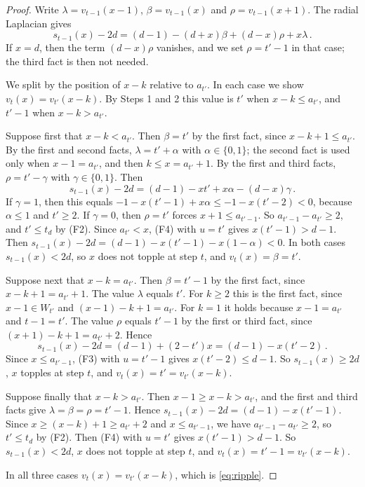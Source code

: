 \documentclass[12pt]{amsart}
\begin{document}
\begin{proof}
        Write $\lambda=v_{t-1}(x-1)$, $\beta=v_{t-1}(x)$ and $\rho=v_{t-1}(x+1)$. The radial Laplacian gives
        \begin{equation*}
        s_{t-1}(x)-2d=(d-1)-(d+x)\beta+(d-x)\rho+x\lambda\,.
        \end{equation*}
        If $x=d$, then the term $(d-x)\rho$ vanishes, and we set $\rho=t'-1$ in that case; the third fact is then not needed.

        We split by the position of $x-k$ relative to $a_{t'}$. In each case we show $v_t(x)=v_{t'}(x-k)$. By Steps 1 and 2 this value is $t'$ when $x-k\leq a_{t'}$, and $t'-1$ when $x-k>a_{t'}$.

        Suppose first that $x-k<a_{t'}$. Then $\beta=t'$ by the first fact, since $x-k+1\leq a_{t'}$. By the first and second facts, $\lambda=t'+\alpha$ with $\alpha\in\{0,1\}$; the second fact is used only when $x-1=a_{t'}$, and then $k\leq x=a_{t'}+1$. By the first and third facts, $\rho=t'-\gamma$ with $\gamma\in\{0,1\}$. Then
        \begin{equation*}
        s_{t-1}(x)-2d=(d-1)-xt'+x\alpha-(d-x)\gamma\,.
        \end{equation*}
        If $\gamma=1$, then this equals $-1-x(t'-1)+x\alpha\leq -1-x(t'-2)<0$, because $\alpha\leq 1$ and $t'\geq 2$. If $\gamma=0$, then $\rho=t'$ forces $x+1\leq a_{t'-1}$. So $a_{t'-1}-a_{t'}\geq 2$, and $t'\leq t_d$ by (F2). Since $a_{t'}<x$, (F4) with $u=t'$ gives $x(t'-1)>d-1$. Then $s_{t-1}(x)-2d=(d-1)-x(t'-1)-x(1-\alpha)<0$. In both cases $s_{t-1}(x)<2d$, so $x$ does not topple at step $t$, and $v_t(x)=\beta=t'$.

        Suppose next that $x-k=a_{t'}$. Then $\beta=t'-1$ by the first fact, since $x-k+1=a_{t'}+1$. The value $\lambda$ equals $t'$. For $k\geq 2$ this is the first fact, since $x-1\in W_{t'}$ and $(x-1)-k+1=a_{t'}$. For $k=1$ it holds because $x-1=a_{t'}$ and $t-1=t'$. The value $\rho$ equals $t'-1$ by the first or third fact, since $(x+1)-k+1=a_{t'}+2$. Hence
        \begin{equation*}
        s_{t-1}(x)-2d=(d-1)+(2-t')x=(d-1)-x(t'-2)\,.
        \end{equation*}
        Since $x\leq a_{t'-1}$, (F3) with $u=t'-1$ gives $x(t'-2)\leq d-1$. So $s_{t-1}(x)\geq 2d$, $x$ topples at step $t$, and $v_t(x)=t'=v_{t'}(x-k)$.

        Suppose finally that $x-k>a_{t'}$. Then $x-1\geq x-k>a_{t'}$, and the first and third facts give $\lambda=\beta=\rho=t'-1$. Hence $s_{t-1}(x)-2d=(d-1)-x(t'-1)$. Since $x\geq (x-k)+1\geq a_{t'}+2$ and $x\leq a_{t'-1}$, we have $a_{t'-1}-a_{t'}\geq 2$, so $t'\leq t_d$ by (F2). Then (F4) with $u=t'$ gives $x(t'-1)>d-1$. So $s_{t-1}(x)<2d$, $x$ does not topple at step $t$, and $v_t(x)=t'-1=v_{t'}(x-k)$.

        In all three cases $v_t(x)=v_{t'}(x-k)$, which is \eqref{eq:ripple}.
    \end{proof}
	
\end{document}
